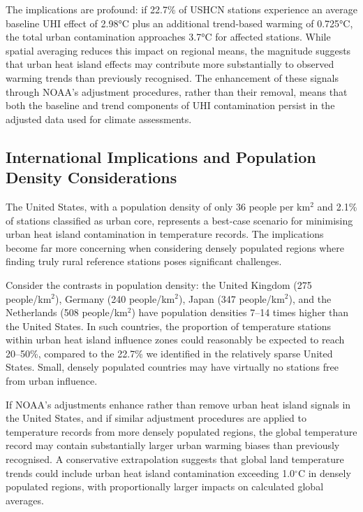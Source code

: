 \documentclass[11pt, a4paper]{article}
\begin{document}
The implications are profound: if 22.7\% of USHCN stations experience an average baseline UHI effect of 2.98°C plus an additional trend-based warming of 0.725°C, the total urban contamination approaches 3.7°C for affected stations. While spatial averaging reduces this impact on regional means, the magnitude suggests that urban heat island effects may contribute more substantially to observed warming trends than previously recognised. The enhancement of these signals through NOAA's adjustment procedures, rather than their removal, means that both the baseline and trend components of UHI contamination persist in the adjusted data used for climate assessments.

\subsection{International Implications and Population Density Considerations}

The United States, with a population density of only 36 people per km$^2$ and 2.1\% of stations classified as urban core, represents a best-case scenario for minimising urban heat island contamination in temperature records. The implications become far more concerning when considering densely populated regions where finding truly rural reference stations poses significant challenges.

Consider the contrasts in population density: the United Kingdom (275 people/km$^2$), Germany (240 people/km$^2$), Japan (347 people/km$^2$), and the Netherlands (508 people/km$^2$) have population densities 7--14 times higher than the United States. In such countries, the proportion of temperature stations within urban heat island influence zones could reasonably be expected to reach 20--50\%, compared to the 22.7\% we identified in the relatively sparse United States. Small, densely populated countries may have virtually no stations free from urban influence.

If NOAA's adjustments enhance rather than remove urban heat island signals in the United States, and if similar adjustment procedures are applied to temperature records from more densely populated regions, the global temperature record may contain substantially larger urban warming biases than previously recognised. A conservative extrapolation suggests that global land temperature trends could include urban heat island contamination exceeding 1.0$^\circ$C in densely populated regions, with proportionally larger impacts on calculated global averages.
\end{document}
